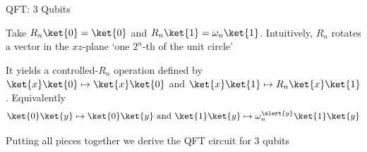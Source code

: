 \documentclass{beamer}
\begin{document}
\begin{frame}{QFT: 3 Qubits}

        Take $R_n\ket{0} = \ket{0}$ and $R_n\ket{1} = \omega_n \ket{1}$.
        Intuitively, $R_n$ rotates a vector in the $xz$-plane
        `\alert{one $2^n$-th} of the unit circle'

        It yields a \alert{controlled}-$R_n$ operation defined by
        $\ket{x}\ket{0} \mapsto \ket{x} \ket{0}$ and $\ket{x}\ket{1} \mapsto
        R_n \ket{x} \ket{1}$. Equivalently
        \[
                \ket{0}\ket{y} \mapsto \ket{0} \ket{y} \text{ and }
                \ket{1}\ket{y} \mapsto \omega^{\alert{y}}_n \ket{1} \ket{y}
        \]

        \pause
        Putting all pieces together we derive the QFT circuit for 3 qubits
        \begin{center}
        \end{center}
\end{frame}
\end{document}
